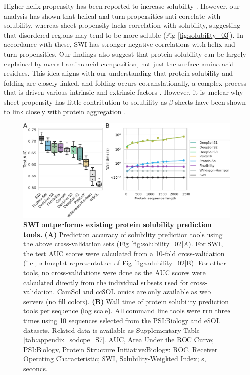Higher helix propensity has been reported to increase solubility \citep{Idicula-Thomas2005-qw,Huang2012-ft}. However, our analysis has shown that helical and turn propensities anti-correlate with solubility, whereas sheet propensity lacks correlation with solubility, suggesting that disordered regions may tend to be more soluble (Fig \ref{fig:solubility_03}). In accordance with these, SWI has stronger negative correlations with helix and turn propensities. Our findings also suggest that protein solubility can be largely explained by overall amino acid composition, not just the surface amino acid residues. This idea aligns with our understanding that protein solubility and folding are closely linked, and folding occurs cotranslationally, a complex process that is driven various intrinsic and extrinsic factors \citep{Wilkinson1991-zp,Davis1999-ha,Chiti2003-zk,Tartaglia2004-wm,Diaz2010-md,Natan2018-hv}. However, it is unclear why sheet propensity has little contribution to solubility as $\beta$-sheets have been shown to link closely with protein aggregation \citep{Idicula-Thomas2005-qw}.

\begin{figure}[!hbtp]
\centerline{\includegraphics[width=1\textwidth]{chapters/Solubility/Figures/fig4.eps}}
\caption[SWI outperforms existing protein solubility prediction tools.]{{ \bf SWI outperforms existing protein solubility prediction tools. (A)} Prediction accuracy of solubility prediction tools using the above cross-validation sets (Fig \ref{fig:solubility_02}A). For SWI, the test AUC scores were calculated from a 10-fold cross-validation (i.e., a boxplot representation of Fig \ref{fig:solubility_02}B). For other tools, no cross-validations were done as the AUC scores were calculated directly from the individual subsets used for cross-validation. CamSol and ccSOL omics are only available as web servers (no fill colors). {\bf (B)} Wall time of protein solubility prediction tools per sequence (log scale). All command line tools were run three times using 10 sequences selected from the PSI:Biology and eSOL datasets. Related data is available as Supplementary Table \ref{tab:appendix_sodope_S7}. AUC, Area Under the ROC Curve; PSI:Biology, Protein Structure Initiative:Biology; ROC, Receiver Operating Characteristic; SWI, Solubility-Weighted Index; s, seconds.
}\label{fig:solubility_04}\vspace*{-10pt}
\end{figure}

